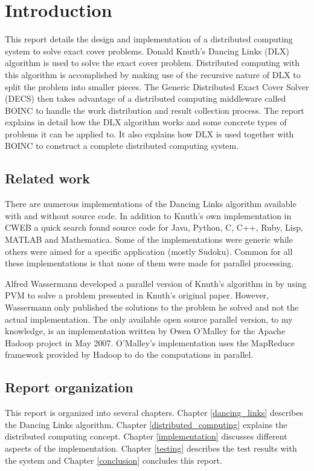 
\chapter{Introduction}

This report details the design and implementation of a distributed computing system to solve exact cover problems.
Donald Knuth's Dancing Links (DLX) algorithm \cite{knuth00dancing} is used to solve the exact cover problem.
Distributed computing with this algorithm is accomplished by making use of the recursive nature of DLX to split the problem into smaller pieces.
The Generic Distributed Exact Cover Solver (DECS) then takes advantage of a distributed computing middleware called BOINC \cite{boinc} to handle the work distribution and result collection process.
The report explains in detail how the DLX algorithm works and some concrete types of problems it can be applied to.
It also explains how DLX is used together with BOINC to construct a complete distributed computing system.


\section{Related work}

There are numerous implementations of the Dancing Links algorithm available with and without source code.
In addition to Knuth's own implementation in CWEB \cite{cweb} a quick search found source code for Java, Python, C, C++, Ruby, Lisp, MATLAB and Mathematica.
Some of the implementations were generic while others were aimed for a specific application (mostly Sudoku).
Common for all these implementations is that none of them were made for parallel processing.

Alfred Wassermann developed a parallel version of Knuth's algorithm in \cite{wassermann99covering} by using PVM \cite{pvm} to solve a problem presented in Knuth's original paper.
However, Wassermann only published the solutions to the problem he solved and not the actual implementation.
The only available open source parallel version, to my knowledge, is an implementation written by Owen O'Malley for the Apache Hadoop project \cite{hadoop} in May 2007.
O'Malley's implementation uses the MapReduce \cite{map-reduce} framework provided by Hadoop to do the computations in parallel.



\section{Report organization}

This report is organized into several chapters.
Chapter \ref{dancing_links} describes the Dancing Links algorithm.
Chapter \ref{distributed_computing} explains the distributed computing concept.
Chapter \ref{implementation} discusses different aspects of the implementation.
Chapter \ref{testing} describes the test results with the system and Chapter \ref{conclusion} concludes this report.




